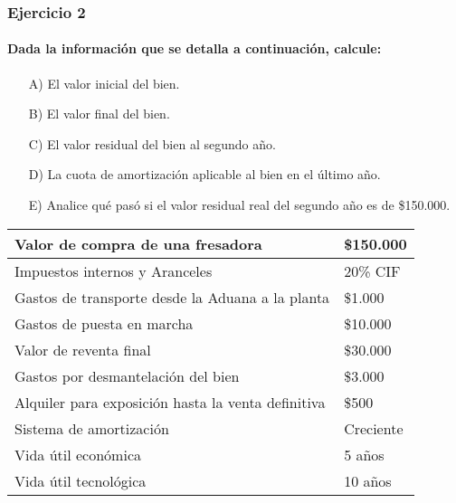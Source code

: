 \documentclass[12pt,a4paper]{article}
\newcommand{\consigna}[1]{\paragraph{\indent #1} \hspace{0pt}}
\begin{document}
        
        \newpage
    
    	\subsubsection{Ejercicio 2}
        
        \consigna{Dada la información que se detalla a continuación, calcule:}
        
        \begin{itemize}
			\item[A)]	El valor inicial del bien.
            \item[B)]	El valor final del bien.
            \item[C)]	El valor residual del bien al segundo año.
            \item[D)]	La cuota de amortización aplicable al bien en el último año.
            \item[E)]	Analice qué pasó si el valor residual real del segundo año es de \$150.000.
		\end{itemize}
        
        \begin{table}[H]
        \centering
        	\begin{tabular}{ | l | l | }
            	\hline
            	Valor de compra de una fresadora					&	\$150.000	\\ \hline
                Impuestos internos y Aranceles						&	20\% CIF	\\ \hline
                Gastos de transporte desde la Aduana a la planta	&	\$1.000		\\ \hline
                Gastos de puesta en marcha							&	\$10.000	\\ \hline
                Valor de reventa final								&	\$30.000	\\ \hline
                Gastos por desmantelación del bien					&	\$3.000		\\ \hline
                Alquiler para exposición hasta la venta definitiva	&	\$500		\\ \hline
                Sistema de amortización								&	Creciente	\\ \hline
                Vida útil económica									&	5 años		\\ \hline
                Vida útil tecnológica								&	10 años		\\ \hline
			\end{tabular}
		\end{table}
        
\end{document}
